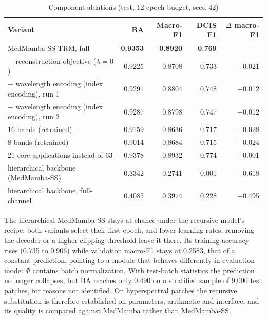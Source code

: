 \documentclass{svproc}
\begin{document}
\begin{table}[t]
\caption{Component ablations (test, 12-epoch budget, seed 42)}
\label{tab:ablation}
\centering\scriptsize
\setlength{\tabcolsep}{4pt}
\begin{tabular}{@{}lrrrr@{}}
\toprule
Variant & BA & Macro-F1 & DCIS F1 & $\Delta$ macro-F1 \\
\midrule
MedMamba-SS-TRM, full & \textbf{0.9353} & \textbf{0.8920} & \textbf{0.769} & --- \\
$-$ reconstruction objective ($\lambda = 0$) & 0.9225 & 0.8708 & 0.733 & $-$0.021 \\
$-$ wavelength encoding (index encoding), run 1 & 0.9291 & 0.8804 & 0.748 & $-$0.012 \\
$-$ wavelength encoding (index encoding), run 2 & 0.9287 & 0.8798 & 0.747 & $-$0.012 \\
16 bands (retrained) & 0.9159 & 0.8636 & 0.717 & $-$0.028 \\
8 bands (retrained) & 0.9014 & 0.8684 & 0.715 & $-$0.024 \\
21 core applications instead of 63 & 0.9378 & 0.8932 & 0.774 & +0.001 \\
hierarchical backbone (MedMamba-SS) & 0.3342 & 0.2741 & 0.001 & $-$0.618 \\
hierarchical backbone, full-channel & 0.4085 & 0.3974 & 0.228 & $-$0.495 \\
\bottomrule
\end{tabular}
\end{table}

The hierarchical MedMamba-SS stays at chance under the recursive model's recipe: both variants select their first epoch, and lower learning rates, removing the decoder or a higher clipping threshold leave it there. Its training accuracy rises (0.735 to 0.906) while validation macro-F1 stays at 0.2583, that of a constant prediction, pointing to a module that behaves differently in evaluation mode: $\Phi$ contains batch normalization. With test-batch statistics the prediction no longer collapses, but BA reaches only 0.490 on a stratified sample of 9,000 test patches, for reasons not identified. On hyperspectral patches the recursive substitution is therefore established on parameters, arithmetic and interface, and its quality is compared against MedMamba rather than MedMamba-SS.
\end{document}
